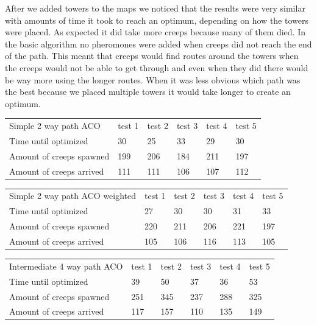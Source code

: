 After we added towers to the maps we noticed that the results were very similar with amounts of time it took to reach an optimum, depending on how the towers were placed. As expected it did take more creeps because many of them died. In the basic algorithm no pheromones were added when creeps did not reach the end of the path. This meant that creeps would find routes around the towers when the creeps would not be able to get through and even when they did there would be way more using the longer routes. When it was less obvious which path was the best because we placed multiple towers it would take longer to create an optimum.

\begin{table}
	\begin{tabular}{llllll}
		Simple 2 way path ACO    & test 1 & test 2 & test 3 & test 4 & test 5 \\
		Time until optimized     & 30     & 25     & 33     & 29     & 30     \\
		Amount of creeps spawned & 199    & 206    & 184    & 211    & 197    \\
		Amount of creeps arrived & 111    & 111    & 106    & 107    & 112    \\
	\end{tabular}
\end{table}



\begin{table}
	\begin{tabular}{llllll}
		Simple 2 way path ACO weighted & test 1 & test 2 & test 3 & test 4 & test 5 \\
		Time until optimized           & 27     & 30     & 30     & 31     & 33     \\
		Amount of creeps spawned       & 220    & 211    & 206    & 221    & 197    \\
		Amount of creeps arrived       & 105    & 106    & 116    & 113    & 105    \\
	\end{tabular}
\end{table}



\begin{table}
	\begin{tabular}{llllll}
		Intermediate 4 way path ACO & test 1 & test 2 & test 3 & test 4 & test 5 \\
		Time until optimized        & 39     & 50     & 37     & 36     & 53     \\
		Amount of creeps spawned    & 251    & 345    & 237    & 288    & 325    \\
		Amount of creeps arrived    & 117    & 157    & 110    & 135    & 149    \\
	\end{tabular}
\end{table}


